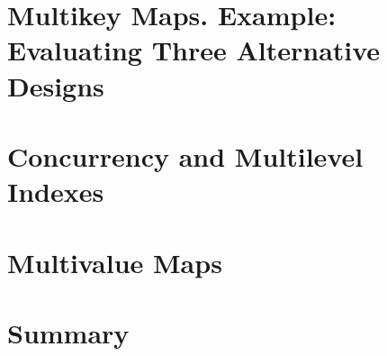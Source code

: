 \section{Multikey Maps. Example: Evaluating Three Alternative Designs}

\section{Concurrency and Multilevel Indexes}

\section{Multivalue Maps}

\section{Summary}




